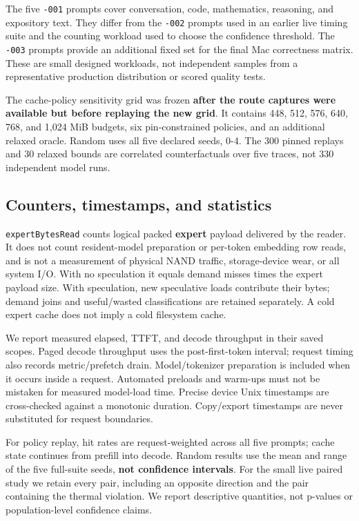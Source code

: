 \documentclass[11pt]{article}
\begin{document}
The five \texttt{-001} prompts cover conversation, code, mathematics, reasoning, and
expository text. They differ from the \texttt{-002} prompts used in an earlier live
timing suite and the counting workload used to choose the confidence
threshold. The \texttt{-003} prompts provide an additional fixed set for the final
Mac correctness matrix. These are small designed workloads, not independent
samples from a representative production distribution or scored quality tests.

The cache-policy sensitivity grid was frozen \textbf{after the route captures were
available but before replaying the new grid}. It contains 448, 512, 576, 640,
768, and 1,024 MiB budgets, six pin-constrained policies, and an additional
relaxed oracle. Random uses all five declared seeds, 0-4. The 300 pinned
replays and 30 relaxed bounds are correlated counterfactuals over five traces,
not 330 independent model runs.

\hypertarget{counters-timestamps-and-statistics}{%
\subsection{Counters, timestamps, and statistics}\label{counters-timestamps-and-statistics}}

\texttt{expertBytesRead} counts logical packed \textbf{expert} payload delivered by the
reader. It does not count resident-model preparation or per-token embedding
row reads, and is not a measurement of physical NAND traffic, storage-device
wear, or all system I/O. With no speculation it equals demand misses times
the expert payload size. With speculation, new speculative loads contribute
their bytes; demand joins and useful/wasted classifications are retained
separately. A cold expert cache does not imply a cold filesystem cache.

We report measured elapsed, TTFT, and decode throughput in their saved
scopes. Paged decode throughput uses the post-first-token interval; request
timing also records metric/prefetch drain. Model/tokenizer preparation is
included when it occurs inside a request. Automated preloads and warm-ups
must not be mistaken for measured model-load time. Precise device Unix
timestamps are cross-checked against a monotonic duration. Copy/export
timestamps are never substituted for request boundaries.

For policy replay, hit rates are request-weighted across all five prompts;
cache state continues from prefill into decode. Random results use the mean
and range of the five full-suite seeds, \textbf{not confidence intervals}.
For the small live paired study we retain every pair, including an opposite
direction and the pair containing the thermal violation. We report
descriptive quantities, not p-values or population-level confidence claims.
\end{document}
